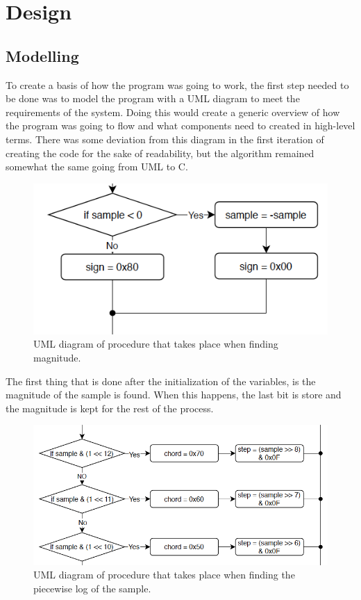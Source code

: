 \documentclass[12pt]{article}
\begin{document}
\section{Design}

\subsection{Modelling}

To create a basis of how the program was going to work, the first step needed to be done was to model the program with a UML diagram to meet the requirements of the system. Doing this would create a generic overview of how the program was going to flow and what components need to created in high-level terms. There was some deviation from this diagram in the first iteration of creating the code for the sake of readability, but the algorithm remained somewhat the same going from UML to C. 

\begin{figure}[!h]
	\centering
	\includegraphics[scale=1]{mag_uml.png}
	\caption{\label{fig:mag_uml}UML diagram of procedure that takes place when finding magnitude.}
\end{figure}

The first thing that is done after the initialization of the variables, is the magnitude of the sample is found. When this happens, the last bit is store and the magnitude is kept for the rest of the process. \\

\begin{figure}[!h]
	\centering
	\includegraphics[scale=1]{step_uml.png}
	\caption{UML diagram of procedure that takes place when finding the piecewise log of the sample.}
\end{figure}
\end{document}
